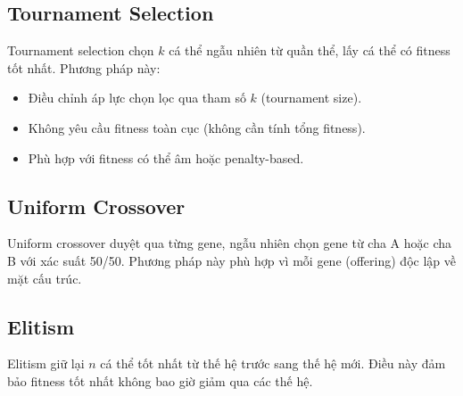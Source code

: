 \subsection{Tournament Selection}
Tournament selection chọn $k$ cá thể ngẫu nhiên từ quần thể, lấy cá thể có fitness tốt nhất. Phương pháp này:
\begin{itemize}
    \item Điều chỉnh áp lực chọn lọc qua tham số $k$ (tournament size).
    \item Không yêu cầu fitness toàn cục (không cần tính tổng fitness).
    \item Phù hợp với fitness có thể âm hoặc penalty-based.
\end{itemize}

\subsection{Uniform Crossover}
Uniform crossover duyệt qua từng gene, ngẫu nhiên chọn gene từ cha A hoặc cha B với xác suất 50/50. Phương pháp này phù hợp vì mỗi gene (offering) độc lập về mặt cấu trúc.

\subsection{Elitism}
Elitism giữ lại $n$ cá thể tốt nhất từ thế hệ trước sang thế hệ mới. Điều này đảm bảo fitness tốt nhất không bao giờ giảm qua các thế hệ.
